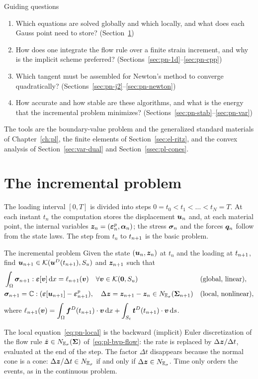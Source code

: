 \begin{gbox}{Guiding questions}
\begin{enumerate}[itemsep=1pt]
  \item Which equations are solved globally and which locally, and what does
  each Gauss point need to store? (Section~\ref{sec:pn-incr})
  \item How does one integrate the flow rule over a finite strain increment,
  and why is the implicit scheme preferred?
  (Sections~\ref{sec:pn-1d}--\ref{sec:pn-cpp})
  \item Which tangent must be assembled for Newton's method to converge
  quadratically? (Sections~\ref{sec:pn-j2}--\ref{sec:pn-newton})
  \item How accurate and how stable are these algorithms, and what is the
  energy that the incremental problem minimizes?
  (Sections~\ref{sec:pn-stab}--\ref{sec:pn-var})
\end{enumerate}
The tools are the boundary-value problem and the generalized standard
materials of Chapter~\ref{ch:pl}, the finite elements of
Section~\ref{sec:el-ritz}, and the convex analysis of
Section~\ref{sec:var-dual} and Section~\ref{ssec:pl-cones}.
\end{gbox}

\section{The incremental problem}\label{sec:pn-incr}
%
The loading interval $[0,T]$ is divided into steps $0=t_0<t_1<\dots<t_N=T$.
At each instant $t_n$ the computation stores the displacement $\bm{u}_n$ and, at
each material point, the internal variables $\bm{z}_n=(\bm{\varepsilon}^{p}_n,\bm{\alpha}_n)$; the
stress $\bm{\sigma}_n$ and the forces $\bm{q}_n$ follow from the state laws. The step
from $t_n$ to $t_{n+1}$ is the basic problem.

\begin{gbox}{The incremental problem}
Given the state $(\bm{u}_n,\bm{z}_n)$ at $t_n$ and the loading at $t_{n+1}$, find
$\bm{u}_{n+1}\in\mathcal{K}(\bm{u}^{D}(t_{n+1}),S_u)$ and $\bm{z}_{n+1}$ such that
\begin{align}
  &\int_\Omega\bm{\sigma}_{n+1}:\bm{\varepsilon}[\bm{v}]\,\mathrm{d} x=\ell_{n+1}(\bm{v})\quad\forall\bm{v}\in\mathcal{K}(\bm{0},S_u)
  &&\text{(global, linear)},\label{eq:pn-global}\\
  &\bm{\sigma}_{n+1}=\mathbb{C}:(\bm{\varepsilon}[\bm{u}_{n+1}]-\bm{\varepsilon}^{p}_{n+1}),\quad
  \Delta\bm{z}=\bm{z}_{n+1}-\bm{z}_n\in N_{\mathbb{E}_{\sigma}}(\bm{\Sigma}_{n+1})
  &&\text{(local, nonlinear)},\label{eq:pn-local}
\end{align}
where $\ell_{n+1}(\bm{v})=\displaystyle\int_\Omega\bm{f}^{D}(t_{n+1})\cdot\bm{v}\,\mathrm{d} x+\int_{S_t}\bm{t}^{D}(t_{n+1})\cdot\bm{v}\,\mathrm{d} s$.
\end{gbox}
\noindent The local equation~\eqref{eq:pn-local} is the backward (implicit)
Euler discretization of the flow rule $\dot{\bm{z}}\in N_{\mathbb{E}_{\sigma}}(\bm{\Sigma})$
of~\eqref{eq:pl-bvp-flow}: the rate is replaced by
$\Delta\bm{z}/\Delta t$, evaluated at the end of the step. The factor $\Delta t$
disappears because the normal cone is a cone: $\Delta\bm{z}/\Delta t\in N_{\mathbb{E}_{\sigma}}$
if and only if $\Delta\bm{z}\in N_{\mathbb{E}_{\sigma}}$. Time only orders the events, as in the
continuous problem.

